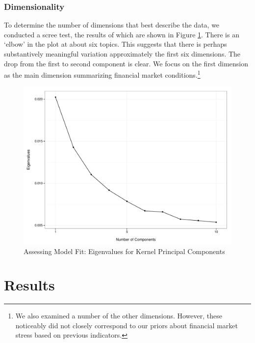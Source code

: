 \documentclass[]{article}
\let\rmarkdownfootnote\footnote%
\def\footnote{\protect\rmarkdownfootnote}
\begin{document}
\subsubsection{Dimensionality}\label{dimensionality}

To determine the number of dimensions that best describe the data, we
conducted a scree test, the results of which are shown in Figure
\ref{scree_plot}. There is an `elbow' in the plot at about six topics.
This suggests that there is perhaps substantively meaningful variation
approximately the first six dimensions. The drop from the first to
second component is clear. We focus on the first dimension as the main
dimension summarizing financial market conditions.\footnote{We also
  examined a number of the other dimensions. However, these noticeably
  did not closely correspond to our priors about financial market stress
  based on previous indicators.}

\begin{figure}
    \caption{Assessing Model Fit: Eigenvalues for Kernel Principal Components}
    \label{scree_plot}
    \begin{center}
        \includegraphics[scale=0.5]{analysis/figures/scree_plot.pdf}
    \end{center}
\end{figure}

\section{Results}\label{results}
\end{document}
